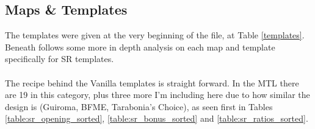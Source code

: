\subsection{Maps \& Templates}

The templates were given at the very beginning of the file, at Table \ref{templates}. Beneath follows some more in depth analysis on each map and template specifically for SR templates.
\\
\\
The recipe behind the Vanilla templates is straight forward. In the MTL there are 19 in this category, plus three more I'm including here due to how similar the design is (Guiroma, BFME, Tarabonia's Choice), as seen first in Tables \ref{table:sr_opening_sorted}, \ref{table:sr_bonus_sorted} and \ref{table:sr_ratios_sorted}.

